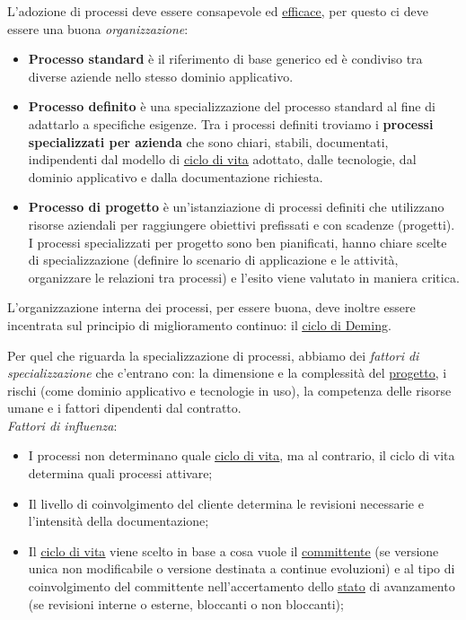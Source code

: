 		L'adozione di processi deve essere consapevole ed \underline{\hyperref[efficacia]{efficace}}, per questo ci deve essere una buona \textit{organizzazione}:
			\begin{itemize}
				\item \textbf{Processo standard} è il riferimento di base generico ed è condiviso tra diverse aziende nello stesso dominio applicativo.
				\item \textbf{Processo definito} è una specializzazione del processo standard al fine di adattarlo a specifiche esigenze. Tra i processi definiti troviamo i \textbf{processi specializzati per azienda} che sono chiari, stabili, documentati, indipendenti dal modello di \underline{\hyperref[ciclo]{ciclo di vita}} adottato, dalle tecnologie, dal dominio applicativo e dalla documentazione richiesta.
				\item \textbf{Processo di progetto} è un'istanziazione di processi definiti che utilizzano risorse aziendali per raggiungere obiettivi prefissati e con scadenze (progetti). I processi specializzati per progetto sono ben pianificati, hanno chiare scelte di specializzazione (definire lo scenario di applicazione e le attività, organizzare le relazioni tra processi) e l'esito viene valutato in maniera critica.
			\end{itemize}
		L'organizzazione interna dei processi, per essere buona, deve inoltre essere incentrata sul principio di miglioramento continuo: il \underline{\hyperref[pdca]{ciclo di Deming}}.
			
		Per quel che riguarda la specializzazione di processi, abbiamo dei \textit{fattori di specializzazione} che c'entrano con: la dimensione e la complessità del \underline{\hyperref[progetto]{progetto}}, i rischi (come dominio applicativo e tecnologie in uso), la competenza delle risorse umane e i fattori dipendenti dal contratto.\\
		\textit{Fattori di influenza}:
			\begin{itemize}
				\item I processi non determinano quale \underline{\hyperref[ciclo]{ciclo di vita}}, ma al contrario, il ciclo di vita determina quali processi attivare;
				\item Il livello di coinvolgimento del cliente determina le revisioni necessarie e l'intensità della documentazione;
				\item Il \underline{\hyperref[ciclo]{ciclo di vita}} viene scelto in base a cosa vuole il \underline{\hyperref[committente]{committente}} (se versione unica non modificabile o versione destinata a continue evoluzioni) e al tipo di coinvolgimento del committente nell'accertamento dello \underline{\hyperref[stato]{stato}} di avanzamento (se revisioni interne o esterne, bloccanti o non bloccanti);
			\end{itemize}
		

